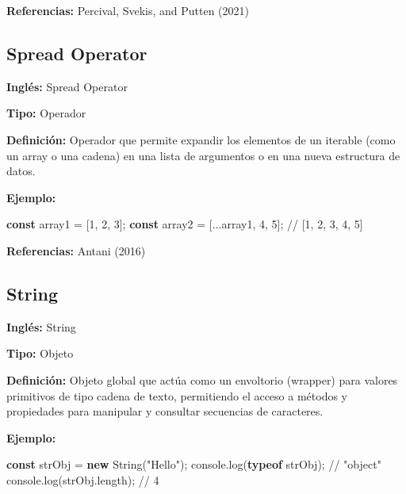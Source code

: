 \documentclass[
  letterpaper,
  DIV=11,
  numbers=noendperiod]{scrreprt}
\newenvironment{Shaded}{\begin{snugshade}}{\end{snugshade}}
\newcommand{\AttributeTok}[1]{\textcolor[rgb]{0.40,0.45,0.13}{#1}}
\newcommand{\BuiltInTok}[1]{\textcolor[rgb]{0.00,0.23,0.31}{#1}}
\newcommand{\CommentTok}[1]{\textcolor[rgb]{0.37,0.37,0.37}{#1}}
\newcommand{\DecValTok}[1]{\textcolor[rgb]{0.68,0.00,0.00}{#1}}
\newcommand{\FunctionTok}[1]{\textcolor[rgb]{0.28,0.35,0.67}{#1}}
\newcommand{\KeywordTok}[1]{\textcolor[rgb]{0.00,0.23,0.31}{\textbf{#1}}}
\newcommand{\NormalTok}[1]{\textcolor[rgb]{0.00,0.23,0.31}{#1}}
\newcommand{\OperatorTok}[1]{\textcolor[rgb]{0.37,0.37,0.37}{#1}}
\newcommand{\StringTok}[1]{\textcolor[rgb]{0.13,0.47,0.30}{#1}}
\let\oldsubsection\subsection
\renewcommand{\subsection}{\phantomsection\oldsubsection}
\begin{document}
\textbf{Referencias:} Percival, Svekis, and Putten (2021)

\subsection*{Spread Operator}\label{glos-spread_operator}

\textbf{Inglés:} Spread Operator

\textbf{Tipo:} Operador

\textbf{Definición:} Operador que permite expandir los elementos de un
iterable (como un array o una cadena) en una lista de argumentos o en
una nueva estructura de datos.

\textbf{Ejemplo:}

\begin{Shaded}
\begin{Highlighting}[]
\KeywordTok{const}\NormalTok{ array1 }\OperatorTok{=}\NormalTok{ [}\DecValTok{1}\OperatorTok{,} \DecValTok{2}\OperatorTok{,} \DecValTok{3}\NormalTok{]}\OperatorTok{;}
\KeywordTok{const}\NormalTok{ array2 }\OperatorTok{=}\NormalTok{ [}\OperatorTok{...}\NormalTok{array1}\OperatorTok{,} \DecValTok{4}\OperatorTok{,} \DecValTok{5}\NormalTok{]}\OperatorTok{;} \CommentTok{// [1, 2, 3, 4, 5]}
\end{Highlighting}
\end{Shaded}

\textbf{Referencias:} Antani (2016)

\subsection*{String}\label{glos-String}

\textbf{Inglés:} String

\textbf{Tipo:} Objeto

\textbf{Definición:} Objeto global que actúa como un envoltorio
(wrapper) para valores primitivos de tipo cadena de texto, permitiendo
el acceso a métodos y propiedades para manipular y consultar secuencias
de caracteres.

\textbf{Ejemplo:}

\begin{Shaded}
\begin{Highlighting}[]
\KeywordTok{const}\NormalTok{ strObj }\OperatorTok{=} \KeywordTok{new} \BuiltInTok{String}\NormalTok{(}\StringTok{"Hello"}\NormalTok{)}\OperatorTok{;}
\BuiltInTok{console}\OperatorTok{.}\FunctionTok{log}\NormalTok{(}\KeywordTok{typeof}\NormalTok{ strObj)}\OperatorTok{;} \CommentTok{// "object"}
\BuiltInTok{console}\OperatorTok{.}\FunctionTok{log}\NormalTok{(strObj}\OperatorTok{.}\AttributeTok{length}\NormalTok{)}\OperatorTok{;} \CommentTok{// 4}
\end{Highlighting}
\end{Shaded}
\end{document}
